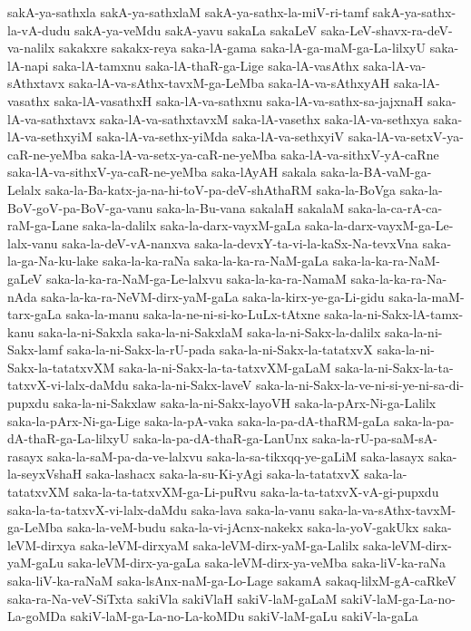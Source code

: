 {sakA-ya-sathxla
sakA-ya-sathxlaM
sakA-ya-sathx-la-miV-ri-tamf
sakA-ya-sathx-la-vA-dudu
sakA-ya-veMdu
sakA-yavu
sakaLa
sakaLeV
saka-LeV-shavx-ra-deV-va-nalilx
sakakxre
sakakx-reya
saka-lA-gama
saka-lA-ga-maM-ga-La-lilxyU
saka-lA-napi
saka-lA-tamxnu
saka-lA-thaR-ga-Lige
saka-lA-vasAthx
saka-lA-va-sAthxtavx
saka-lA-va-sAthx-tavxM-ga-LeMba
saka-lA-va-sAthxyAH
saka-lA-vasathx
saka-lA-vasathxH
saka-lA-va-sathxnu
saka-lA-va-sathx-sa-jajxnaH
saka-lA-va-sathxtavx
saka-lA-va-sathxtavxM
saka-lA-vasethx
saka-lA-va-sethxya
saka-lA-va-sethxyiM
saka-lA-va-sethx-yiMda
saka-lA-va-sethxyiV
saka-lA-va-setxV-ya-caR-ne-yeMba
saka-lA-va-setx-ya-caR-ne-yeMba
saka-lA-va-sithxV-yA-caRne
saka-lA-va-sithxV-ya-caR-ne-yeMba
saka-lAyAH
sakala
saka-la-BA-vaM-ga-Lelalx
saka-la-Ba-katx-ja-na-hi-toV-pa-deV-shAthaRM
saka-la-BoVga
saka-la-BoV-goV-pa-BoV-ga-vanu
saka-la-Bu-vana
sakalaH
sakalaM
saka-la-ca-rA-ca-raM-ga-Lane
saka-la-dalilx
saka-la-darx-vayxM-gaLa
saka-la-darx-vayxM-ga-Le-lalx-vanu
saka-la-deV-vA-nanxva
saka-la-devxY-ta-vi-la-kaSx-Na-tevxVna
saka-la-ga-Na-ku-lake
saka-la-ka-raNa
saka-la-ka-ra-NaM-gaLa
saka-la-ka-ra-NaM-gaLeV
saka-la-ka-ra-NaM-ga-Le-lalxvu
saka-la-ka-ra-NamaM
saka-la-ka-ra-Na-nAda
saka-la-ka-ra-NeVM-dirx-yaM-gaLa
saka-la-kirx-ye-ga-Li-gidu
saka-la-maM-tarx-gaLa
saka-la-manu
saka-la-ne-ni-si-ko-LuLx-tAtxne
saka-la-ni-Sakx-lA-tamx-kanu
saka-la-ni-Sakxla
saka-la-ni-SakxlaM
saka-la-ni-Sakx-la-dalilx
saka-la-ni-Sakx-lamf
saka-la-ni-Sakx-la-rU-pada
saka-la-ni-Sakx-la-tatatxvX
saka-la-ni-Sakx-la-tatatxvXM
saka-la-ni-Sakx-la-ta-tatxvXM-gaLaM
saka-la-ni-Sakx-la-ta-tatxvX-vi-lalx-daMdu
saka-la-ni-Sakx-laveV
saka-la-ni-Sakx-la-ve-ni-si-ye-ni-sa-di-pupxdu
saka-la-ni-Sakxlaw
saka-la-ni-Sakx-layoVH
saka-la-pArx-Ni-ga-Lalilx
saka-la-pArx-Ni-ga-Lige
saka-la-pA-vaka
saka-la-pa-dA-thaRM-gaLa
saka-la-pa-dA-thaR-ga-La-lilxyU
saka-la-pa-dA-thaR-ga-LanUnx
saka-la-rU-pa-saM-sA-rasayx
saka-la-saM-pa-da-ve-lalxvu
saka-la-sa-tikxqq-ye-gaLiM
saka-lasayx
saka-la-seyxVshaH
saka-lashacx
saka-la-su-Ki-yAgi
saka-la-tatatxvX
saka-la-tatatxvXM
saka-la-ta-tatxvXM-ga-Li-puRvu
saka-la-ta-tatxvX-vA-gi-pupxdu
saka-la-ta-tatxvX-vi-lalx-daMdu
saka-lava
saka-la-vanu
saka-la-va-sAthx-tavxM-ga-LeMba
saka-la-veM-budu
saka-la-vi-jAcnx-nakekx
saka-la-yoV-gakUkx
saka-leVM-dirxya
saka-leVM-dirxyaM
saka-leVM-dirx-yaM-ga-Lalilx
saka-leVM-dirx-yaM-gaLu
saka-leVM-dirx-ya-gaLa
saka-leVM-dirx-ya-veMba
saka-liV-ka-raNa
saka-liV-ka-raNaM
saka-lsAnx-naM-ga-Lo-Lage
sakamA
sakaq-lilxM-gA-caRkeV
saka-ra-Na-veV-SiTxta
sakiVla
sakiVlaH
sakiV-laM-gaLaM
sakiV-laM-ga-La-no-La-goMDa
sakiV-laM-ga-La-no-La-koMDu
sakiV-laM-gaLu
sakiV-la-gaLa
}
